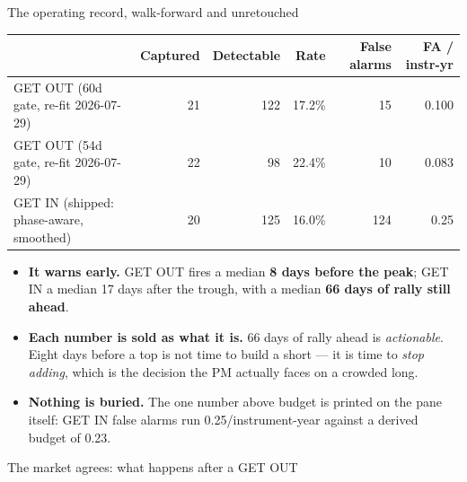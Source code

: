 \documentclass[aspectratio=169,11pt]{beamer}
\begin{document}
\begin{frame}{The operating record, walk-forward and unretouched}
  \begin{table}
    \scriptsize
    \setlength{\tabcolsep}{4pt}
    \begin{tabular}{@{}lrrrrr@{}}
      \toprule
      & \textbf{Captured} & \textbf{Detectable} & \textbf{Rate}
      & \textbf{False alarms} & \textbf{FA / instr-yr} \\
      \midrule
      GET OUT (60d gate, re-fit 2026-07-29) & 21 & 122 & 17.2\% & 15 & 0.100 \\
      GET OUT (54d gate, re-fit 2026-07-29) & 22 & 98 & 22.4\% & 10 & 0.083 \\
      GET IN  (shipped: phase-aware, smoothed) & 20 & 125 & 16.0\% & 124 & 0.25 \\
      \bottomrule
    \end{tabular}
  \end{table}
  \vspace{0.2em}
  \begin{itemize}\footnotesize
    \item \textbf{It warns early.} GET OUT fires a median \textbf{8 days before
      the peak}; GET IN a median 17 days after the trough, with a median
      \textbf{66 days of rally still ahead}.
    \item \textbf{Each number is sold as what it is.} 66 days of rally ahead is
      \emph{actionable}. Eight days before a top is not time to build a short
      --- it is time to \emph{stop adding}, which is the decision the PM
      actually faces on a crowded long.
    \item \textbf{Nothing is buried.} The one number above budget is printed on
      the pane itself: GET IN false alarms run 0.25/instrument-year against a
      derived budget of 0.23.
  \end{itemize}
\end{frame}

\begin{frame}{The market agrees: what happens after a GET OUT}
\end{frame}
\end{document}

